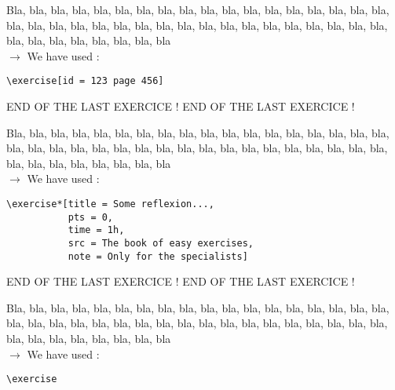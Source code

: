 \documentclass[12pt]{article}
\newcommand\blabla{%
		\noindent Bla, bla, bla, bla, bla, bla, bla, bla, bla, bla, bla,
		bla, bla, bla, bla, bla, bla, bla, bla, bla, bla, bla,
		bla, bla, bla, bla, bla, bla, bla, bla, bla, bla, bla,
		bla, bla, bla, bla, bla, bla, bla, bla, bla, bla, bla
	}
\newcommand\codeused{
		\blabla{} \medskip  \\ \noindent $\rightarrow$ We have used :
	}
\begin{document}
\exercise[id = 123 page 456]

\codeused{}
\begin{verbatim}
\exercise[id = 123 page 456]
\end{verbatim}



\newpage \medskip \noindent END OF THE LAST EXERCICE ! END OF THE LAST EXERCICE !

\exercise*[title = Some reflexion..., pts = 0, time = 1h, src = The book of easy exercises, note = Only for the specialists]

\codeused{}
\begin{verbatim}
\exercise*[title = Some reflexion..., 
           pts = 0, 
           time = 1h,
           src = The book of easy exercises,
           note = Only for the specialists]
\end{verbatim}

\newpage \medskip \noindent END OF THE LAST EXERCICE ! END OF THE LAST EXERCICE !

\exercise

\codeused{}
\begin{verbatim}
\exercise
\end{verbatim}
\end{document}

